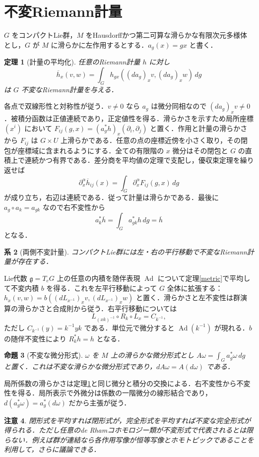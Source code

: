 \documentclass[a5paper,10pt,onecolumn]{jsarticle}
\makeatletter
\theoremstyle{mathnotetheorem}
\newtheorem{theorem}{定理}[section]
\newtheorem{proposition}[theorem]{命題}
\newtheorem{corollary}[theorem]{系}
\newtheorem{remark}[theorem]{注意}
\renewcommand{\proofname}{証明}
\renewenvironment{proof}[1][\proofname]{%
  \par\pushQED{\qed}\normalfont\topsep4\p@\@plus2\p@\relax
  \trivlist\item[\hskip\labelsep\bfseries #1]\ignorespaces
}{\popQED\endtrivlist\@endpefalse}
\makeatother
\begin{document}
\section{不変Riemann計量}
$G$ をコンパクトLie群，$M$ をHausdorffかつ第二可算な滑らかな有限次元多様体とし，$G$ が $M$ に滑らかに左作用するとする．$a_g(x)=gx$ と書く．
\begin{theorem}[計量の平均化]\label{riem}
任意のRiemann計量 $h$ に対し
\[
 \overline h_x(v,w)=\int_G h_{gx}((da_g)_xv,(da_g)_xw)\,dg
\]
は $G$ 不変なRiemann計量を与える．
\end{theorem}
\begin{proof}
各点で双線形性と対称性が従う．$v\ne0$ なら $a_g$ は微分同相なので $(da_g)_xv\ne0$．被積分函数は正値連続であり，正定値性を得る．滑らかさを示すため局所座標 $(x^i)$ において $F_{ij}(g,x)=(a_g^*h)_x(\partial_i,\partial_j)$ と置く．作用と計量の滑らかさから $F_{ij}$ は $G\times U$ 上滑らかである．任意の点の座標近傍を小さく取り，その閉包が座標域に含まれるようにする．全ての有限階の $x$ 微分はその閉包と $G$ の直積上で連続かつ有界である．差分商を平均値の定理で支配し，優収束定理を繰り返せば
\[
 \partial_x^\alpha\overline h_{ij}(x)
 =\int_G\partial_x^\alpha F_{ij}(g,x)\,dg
\]
が成り立ち，右辺は連続である．従って計量は滑らかである．最後に $a_g\circ a_k=a_{gk}$ なので右不変性から
\[
 a_k^*\overline h=\int_G a_{gk}^*h\,dg=\overline h
\]
となる．
\end{proof}
\begin{corollary}[両側不変計量]
コンパクトLie群には左・右の平行移動で不変なRiemann計量が存在する．
\end{corollary}
\begin{proof}
Lie代数 $\mathfrak g=T_eG$ 上の任意の内積を随伴表現 $\operatorname{Ad}$ について定理\ref{metric}で平均して不変内積 $b$ を得る．これを左平行移動によって $G$ 全体に拡張する：$h_x(v,w)=b((dL_{x^{-1}})_xv,(dL_{x^{-1}})_xw)$ と置く．滑らかさと左不変性は群演算の滑らかさと合成則から従う．右平行移動については
\[
 L_{(xk)^{-1}}\circ R_k\circ L_x=C_{k^{-1}},
\]
ただし $C_{k^{-1}}(y)=k^{-1}yk$ である．単位元で微分すると $\operatorname{Ad}(k^{-1})$ が現れる．$b$ の随伴不変性により $R_k^*h=h$ となる．
\end{proof}
\begin{proposition}[不変な微分形式]
$\omega$ を $M$ 上の滑らかな微分形式とし $A\omega=\int_G a_g^*\omega\,dg$ と置く．これは不変な滑らかな微分形式であり，$dA\omega=A(d\omega)$ である．
\end{proposition}
\begin{proof}
局所係数の滑らかさは定理\ref{riem}と同じ微分と積分の交換による．右不変性から不変性を得る．局所表示で外微分は係数の一階微分の線形結合であり，$d(a_g^*\omega)=a_g^*(d\omega)$ だから主張が従う．
\end{proof}
\begin{remark}
閉形式を平均すれば閉形式が，完全形式を平均すれば不変な完全形式が得られる．ただし任意のde Rhamコホモロジー類が不変形式で代表されるとは限らない．例えば群が連結なら各作用写像が恒等写像とホモトピックであることを利用して，さらに議論できる．
\end{remark}
\end{document}
